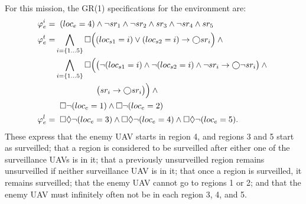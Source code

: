 \documentclass[runningheads]{llncs}
\begin{document}
For this mission, the GR(1) specifications for the environment are:
%
\small
\begin{align}
\varphi_e^i  = & \;\; (loc_e = 4) \land \lnot sr_1 \land \lnot sr_2 \land sr_3 \land \lnot sr_4 \land sr_5  \label{eq:vipEnvInit} \\
\varphi_e^t  = & \bigwedge_{i = \{1 \ldots 5\}} \square \Big((loc_{s1} = i) \lor  (loc_{s2} = i) \rightarrow \varbigcirc sr_i \Big) \land \mbox{} \label{eq:srSet} \\
 & \bigwedge_{i = \{1 \ldots 5\}} \square \Big(\big(\lnot (loc_{s1} = i) \land  \lnot (loc_{s2} = i) \land \lnot sr_i \rightarrow \varbigcirc \lnot sr_i\big) \land \mbox{} \label{eq:vipEnvNoSp} \\
 & \quad\quad\quad\quad\quad \big(sr_i \rightarrow \varbigcirc sr_i\big)\Big) \land \mbox{} \label{eq:vipEnvSetSp} \\
 & \;\; \square \lnot (loc_e = 1) \land \square \lnot (loc_e = 2) \label{eq:vipEnvDisallowedRegions} \\
\varphi_e^l = & \;\; \square \lozenge \lnot (loc_e = 3) \land \square \lozenge \lnot (loc_e = 4) \land \square \lozenge \lnot (loc_e = 5). \label{eq:vipEnvLiveness}
\end{align}
%
These express  that the enemy UAV starts in region 4, and regions 3 and 5 start as surveilled; 
 that a region is considered to be surveilled after either one of the surveillance UAVs is in it; 
 that a previously unsurveilled region remains unsurveilled if neither surveillance UAV is in it; 
 that once a region is surveilled, it remains surveilled; 
 that the enemy UAV cannot go to regions 1 or 2; and
 that the enemy UAV must infinitely often not be in each region 3, 4, and 5. 
\end{document}
